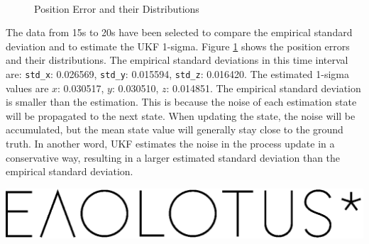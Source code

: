 \documentclass[letter, 10pt]{article}
\begin{document}
\begin{onehalfspacing}
\begin{figure}[t!]
	\centering
	\quad
	\\
	\quad
	\caption{Position Error and their Distributions}
	\label{MSEinterval}	
\end{figure}

The data from 15s to 20s have been selected to compare the empirical standard deviation and to estimate the UKF 1-sigma. Figure \ref{MSEinterval} shows the position errors and their distributions. The empirical standard deviations in this time interval are: {\tt std\_x}: 0.026569, {\tt std\_y}: 0.015594, {\tt std\_z}: 0.016420. The estimated 1-sigma values are $x$: 0.030517, $y$: 0.030510, $z$: 0.014851. The empirical standard deviation is smaller than the estimation. This is because the noise of each estimation state will be propagated to the next state. When updating the state, the noise will be accumulated, but the mean state value will generally stay close to the ground truth. In another word, UKF estimates the noise in the process update in a conservative way, resulting in a larger estimated standard deviation than the empirical standard deviation.

\vfill
\begin{center}
	\includegraphics[scale = 0.4]{evolutus-black.eps}
\end{center}


\thispagestyle{fancy}
	
\end{onehalfspacing}
\end{document}
